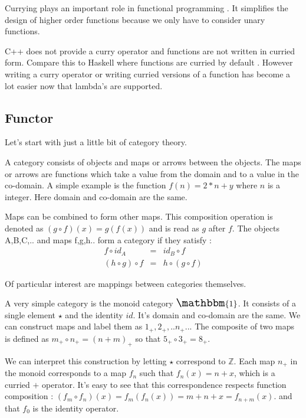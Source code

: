 \documentclass[12pt,fleqn]{article}
\begin{document}
%
%
%


Currying plays an important role in functional programming \cite{field}. 
It simplifies the design of higher order functions because we only have to consider unary functions.

C++ does not provide a curry operator and functions are not written in curried form. 
Compare this to Haskell where functions are curried by default \cite{lipovaca, hutton}.
However writing a curry operator or writing curried versions of a function has become a lot easier now that lambda's are supported.



%
%
\subsection{Functor}
\label{subsec:functor}

%
%
%
Let's start with just a little bit of category theory.

A category consists of objects and maps or arrows between the objects.
The maps or arrows are functions which take a value from the domain and to a value in the co-domain. A simple example is the function $f(n) = 2*n + y$ 
where $n$ is a integer. Here domain and co-domain are the same.

Maps can be combined to form other maps.
This composition operation is denoted as $(g \circ f)(x) = g(f(x))$ and is read as $g$ after $f$.
The  objects A,B,C,.. and maps f,g,h.. form a category if they satisfy :
\begin{eqnarray*}
f \circ id_{A} &=& id_{B} \circ f \\
(h \circ g) \circ f &=& h \circ (g \circ f)
\end{eqnarray*}

Of particular interest are mappings between categories themselves.

A very simple category is the monoid category $\Large \mathbbm{1}$.
It consists of a single element $\star$ and the identity $id$.
It's domain and co-domain are the same.
We can construct maps and label them as $1_+, 2_+,..n_+..$.
The composite of two maps is defined as $m_+ \circ n_+ = (n+m)_+$ so that $5_+ \circ 3_+ = 8_+$.

We can interpret this construction by letting $\star$ correspond to $\mathbb{Z}$.
Each map $n_+$ in the monoid corresponds to a map $f_n$ such that $f_{n}(x) = n + x$, which is a curried $+$ operator. 
It's easy to see that this correspondence respects function composition : $(f_m \circ f_n) (x) = f_m(f_n(x)) = m + n + x = f_{n+m}(x)$.
and that $f_0$ is the identity operator.
\end{document}
